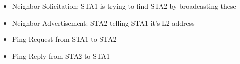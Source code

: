 \begin{itemize}

\item Neighbor Solicitation:  STA1 is trying to find STA2 by broadcasting these
\item Neighbor Advertisement: STA2 telling STA1 it's L2 address
\item Ping Request from STA1 to STA2
\item Ping Reply from STA2 to STA1
\end{itemize}
